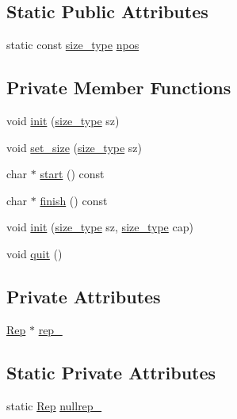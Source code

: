 \subsection*{Static Public Attributes}
\begin{DoxyCompactItemize}
\item 
static const \hyperlink{class_ti_xml_string_abeb2c1893a04c17904f7c06546d0b971}{size\_\-type} \hyperlink{class_ti_xml_string_a1aa6260982d3a63f0c822fe40fd7b37f}{npos}
\end{DoxyCompactItemize}
\subsection*{Private Member Functions}
\begin{DoxyCompactItemize}
\item 
void \hyperlink{class_ti_xml_string_a694eacb51c43d8eba8aa7d4552b598ff}{init} (\hyperlink{class_ti_xml_string_abeb2c1893a04c17904f7c06546d0b971}{size\_\-type} sz)
\item 
void \hyperlink{class_ti_xml_string_a5d70615367bf2920c25feddf6ac4ad30}{set\_\-size} (\hyperlink{class_ti_xml_string_abeb2c1893a04c17904f7c06546d0b971}{size\_\-type} sz)
\item 
char $\ast$ \hyperlink{class_ti_xml_string_a36417caceebe25352f53a87e8cd966b4}{start} () const 
\item 
char $\ast$ \hyperlink{class_ti_xml_string_a58faf1c6b9828c8d5d5092bebf146167}{finish} () const 
\item 
void \hyperlink{class_ti_xml_string_ae11cd23e090fd2e7bb62eda05b45a2d6}{init} (\hyperlink{class_ti_xml_string_abeb2c1893a04c17904f7c06546d0b971}{size\_\-type} sz, \hyperlink{class_ti_xml_string_abeb2c1893a04c17904f7c06546d0b971}{size\_\-type} cap)
\item 
void \hyperlink{class_ti_xml_string_aa6008ae51286a342cd366fbf1e3eeafc}{quit} ()
\end{DoxyCompactItemize}
\subsection*{Private Attributes}
\begin{DoxyCompactItemize}
\item 
\hyperlink{struct_ti_xml_string_1_1_rep}{Rep} $\ast$ \hyperlink{class_ti_xml_string_ac7be48f31ca451bcb16de428b5c40e0c}{rep\_\-}
\end{DoxyCompactItemize}
\subsection*{Static Private Attributes}
\begin{DoxyCompactItemize}
\item 
static \hyperlink{struct_ti_xml_string_1_1_rep}{Rep} \hyperlink{class_ti_xml_string_a345791f81a4b1da64404886f3b2c244d}{nullrep\_\-}
\end{DoxyCompactItemize}


